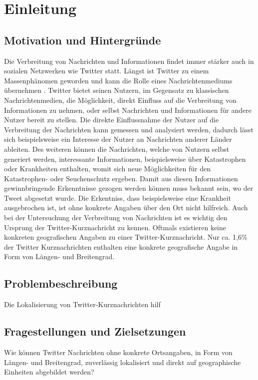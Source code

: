 \chapter{Einleitung}

	\section{Motivation und Hintergründe}

		Die Verbreitung von Nachrichten und Informationen findet immer stärker auch in sozialen Netzwerken wie Twitter statt. 
		Längst ist Twitter zu einem Massenphänomen geworden und kann die Rolle eines Nachrichtenmediums übernehmen \cite{Petrovic2013}.
		Twitter bietet seinen Nutzern, im Gegensatz zu klassischen Nachrichtenmedien, die Möglichkeit, direkt Einfluss auf die Verbreitung von Informationen zu nehmen, oder selbst Nachrichten und Informationen für andere Nutzer bereit zu stellen.  
		Die direkte Einflussnahme der Nutzer auf die Verbreitung der Nachrichten kann gemessen und analysiert werden, dadurch lässt sich beispielsweise ein Interesse der Nutzer an Nachrichten anderer Länder ableiten.
		Des weiteren können die Nachrichten, welche von Nutzern selbst generiert werden, interessante Informationen, beispielsweise über Katastrophen oder  Krankheiten enthalten, womit sich neue Möglichkeiten für den Katastrophen- oder Seuchenschutz ergeben. 
		Damit aus diesen Informationen gewinnbringende Erkenntnisse gezogen werden können muss bekannt sein, wo der Tweet abgesetzt wurde. 
		Die Erkentniss, dass beispielsweise eine Krankheit ausgebrochen ist, ist ohne konkrete Angaben über den Ort nicht hilfreich.
		Auch bei der Untersuchung der Verbreitung von Nachrichten ist es wichtig den Ursprung der Twitter-Kurznachricht zu kennen.  
		Oftmals existieren keine konkreten geografischen Angaben zu einer Twitter-Kurznachricht. 
		Nur ca. 1,6\% der Twitter Kurznachrichten enthalten eine konkrete geografische Angabe in Form von Längen- und Breitengrad. 


	\section{Problembeschreibung} 
		Die Lokalisierung von Twitter-Kurznachrichten hilf

	\section{Fragestellungen und Zielsetzungen}
		Wie können Twitter Nachrichten ohne konkrete Ortsangaben, in Form von Längen- und Breitengrad, zuverlässig lokalisiert und direkt auf geographische Einheiten abgebildet werden?


